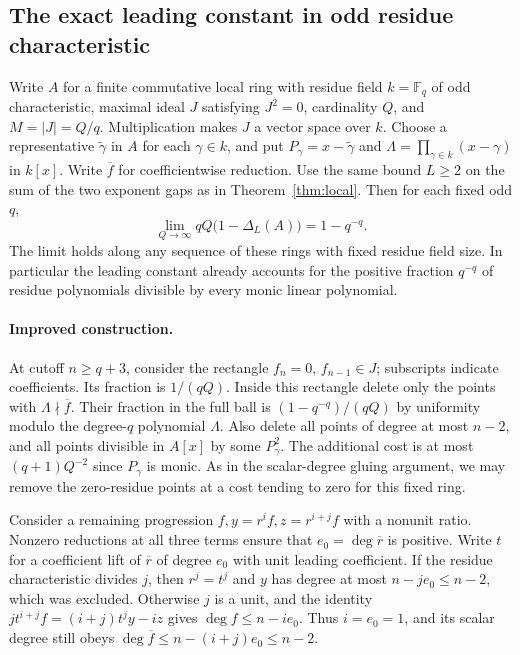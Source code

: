\subsection{The exact leading constant in odd residue characteristic}
\label{sec:odd-leading}

Write $A$ for a finite commutative local ring with residue field
$k=\mathbb F_q$ of odd characteristic, maximal ideal $J$ satisfying
$J^2=0$, cardinality $Q$, and $M=|J|=Q/q$. Multiplication makes
$J$ a vector space over $k$. Choose a representative $\widetilde\gamma$
in $A$ for each $\gamma\in k$, and put
$P_\gamma=x-\widetilde\gamma$ and
$\Lambda=\prod_{\gamma\in k}(x-\gamma)$ in $k[x]$.
Write $\overline f$ for coefficientwise reduction. Use the same bound $L\ge2$ on the sum of the two exponent gaps as in Theorem~\ref{thm:local}.
Then for each fixed odd $q$,
\[
   \lim_{Q\to\infty} qQ\bigl(1-\Delta_L(A)\bigr)=1-q^{-q}.
\]
The limit holds along any sequence of these rings with fixed residue
field size. In particular the leading constant already accounts for
the positive fraction $q^{-q}$ of residue polynomials divisible by
every monic linear polynomial.

\paragraph{Improved construction.}
At cutoff $n\ge q+3$, consider the rectangle $f_n=0$, $f_{n-1}\in J$;
subscripts indicate coefficients. Its fraction is $1/(qQ)$.
Inside this rectangle delete only the points with
$\Lambda\nmid\overline f$. Their fraction in the full ball is
$(1-q^{-q})/(qQ)$ by uniformity modulo the degree-$q$ polynomial $\Lambda$.
Also delete all points of degree at most $n-2$, and all points divisible
in $A[x]$ by some $P_\gamma^2$. The additional cost is at most
$(q+1)Q^{-2}$ since $P_\gamma$ is monic.
As in the scalar-degree gluing argument, we may remove the
zero-residue points at a cost tending to zero for this fixed ring.

Consider a remaining progression $f,y=r^i f,z=r^{i+j}f$ with a nonunit ratio.
Nonzero reductions at all three terms ensure that
$e_0=\deg\overline r$ is positive.
Write $t$ for a coefficient lift of $\overline r$ of degree $e_0$ with unit leading coefficient.
If the residue characteristic divides $j$, then $r^j=t^j$ and $y$ has
degree at most $n-je_0\le n-2$, which was excluded.
Otherwise $j$ is a unit, and the identity
$j t^{i+j} f=(i+j)t^j y-i z$ gives $\deg f\le n-ie_0$.
Thus $i=e_0=1$, and its scalar degree still obeys
$\deg\overline f\le n-(i+j)e_0\le n-2$.

